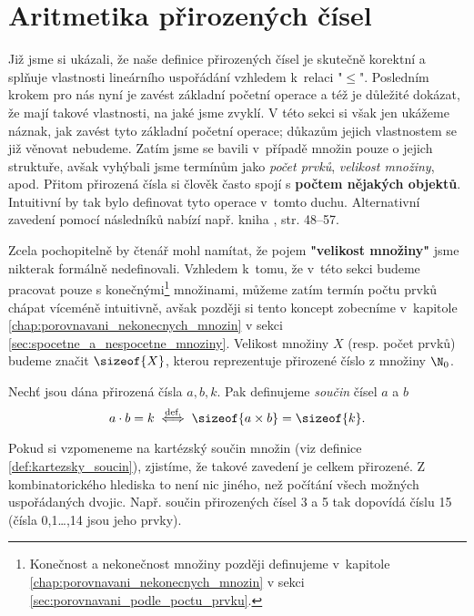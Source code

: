 \section{Aritmetika přirozených čísel}\label{sec:aritmetika_prirozenych_cisel}
Již jsme si ukázali, že naše definice přirozených čísel je skutečně korektní a splňuje vlastnosti lineárního uspořádání vzhledem k~relaci "$\leq$". Posledním krokem pro nás nyní je zavést základní početní operace a též je důležité dokázat, že mají takové vlastnosti, na jaké jsme zvyklí. V této sekci si však jen ukážeme náznak, jak zavést tyto základní početní operace; důkazům jejich vlastnostem se již věnovat nebudeme. Zatím jsme se bavili v~případě množin pouze o jejich struktuře, avšak vyhýbali jsme termínům jako \emph{počet prvků}, \emph{velikost množiny}, apod. Přitom přirozená čísla si člověk často spojí s \textbf{počtem nějakých objektů}. Intuitivní by tak bylo definovat tyto operace v~tomto duchu. Alternativní zavedení pomocí následníků nabízí např. kniha \cite{Goldrei2017}, str. 48--57.\par
Zcela pochopitelně by čtenář mohl namítat, že pojem \textbf{"velikost množiny"} jsme nikterak formálně nedefinovali. Vzhledem k~tomu, že v~této sekci budeme pracovat pouze s konečnými\footnote{Konečnost a nekonečnost množiny později definujeme v~kapitole \ref{chap:porovnavani_nekonecnych_mnozin} v sekci \ref{sec:porovnavani_podle_poctu_prvku}.} množinami, můžeme zatím termín počtu prvků chápat víceméně intuitivně, avšak později si tento koncept zobecníme v~kapitole \ref{chap:porovnavani_nekonecnych_mnozin} v sekci \ref{sec:spocetne_a_nespocetne_mnoziny}. Velikost množiny $X$ (resp. počet prvků) budeme značit $\sizeof{X}$, kterou reprezentuje přirozené číslo z množiny $\N_0$.\par
\begin{definition}\label{def:soucin_pritozenych_cisel}
    Nechť jsou dána přirozená čísla $a,b,k$. Pak definujeme \emph{součin} čísel $a$ a $b$
    \begin{equation*}
        a\cdot b=k\stackrel{\text{def.}}{\iff} \sizeof{a\times b}=\sizeof{k}.
    \end{equation*}
\end{definition}
Pokud si vzpomeneme na kartézský součin množin (viz definice \ref{def:kartezsky_soucin}), zjistíme, že takové zavedení je celkem přirozené. Z kombinatorického hlediska to není nic jiného, než počítání všech možných uspořádaných dvojic. Např. součin přirozených čísel 3 a 5 tak dopovídá číslu 15 (čísla 0,1\dots,14 jsou jeho prvky).\par
